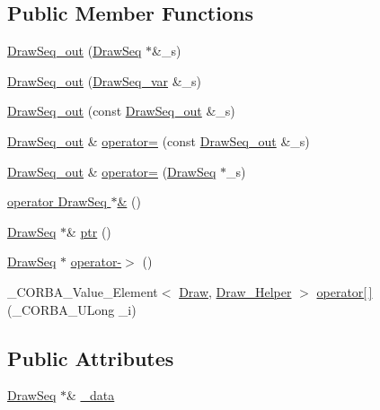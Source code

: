 \subsection*{Public Member Functions}
\begin{DoxyCompactItemize}
\item 
\hyperlink{class_draw_seq__out_a3bcf2290b7ec119dd19ccf5b377c1aa1}{Draw\+Seq\+\_\+out} (\hyperlink{class_draw_seq}{Draw\+Seq} $\ast$\&\+\_\+s)
\item 
\hyperlink{class_draw_seq__out_a9aa391f0c2e359b622ca004de2febf74}{Draw\+Seq\+\_\+out} (\hyperlink{class_draw_seq__var}{Draw\+Seq\+\_\+var} \&\+\_\+s)
\item 
\hyperlink{class_draw_seq__out_ad924617c29ae2842379aa377c5ff797f}{Draw\+Seq\+\_\+out} (const \hyperlink{class_draw_seq__out}{Draw\+Seq\+\_\+out} \&\+\_\+s)
\item 
\hyperlink{class_draw_seq__out}{Draw\+Seq\+\_\+out} \& \hyperlink{class_draw_seq__out_a94b4fa040ba74b352f90918383cb7ff8}{operator=} (const \hyperlink{class_draw_seq__out}{Draw\+Seq\+\_\+out} \&\+\_\+s)
\item 
\hyperlink{class_draw_seq__out}{Draw\+Seq\+\_\+out} \& \hyperlink{class_draw_seq__out_ac27b922495c2dacebe0a4f92dc66c937}{operator=} (\hyperlink{class_draw_seq}{Draw\+Seq} $\ast$\+\_\+s)
\item 
\hyperlink{class_draw_seq__out_afe73ef013d4a5d6c843e6c3ff2dbfe98}{operator Draw\+Seq $\ast$\&} ()
\item 
\hyperlink{class_draw_seq}{Draw\+Seq} $\ast$\& \hyperlink{class_draw_seq__out_aa2723e52af6f4aecd33f619ffb3f9205}{ptr} ()
\item 
\hyperlink{class_draw_seq}{Draw\+Seq} $\ast$ \hyperlink{class_draw_seq__out_ac5275d7c723608533feb25d9def2b9cd}{operator-\/$>$} ()
\item 
\+\_\+\+C\+O\+R\+B\+A\+\_\+\+Value\+\_\+\+Element$<$ \hyperlink{class_draw}{Draw}, \hyperlink{class_draw___helper}{Draw\+\_\+\+Helper} $>$ \hyperlink{class_draw_seq__out_ade588ecd45acfb9aacbf9cdc58464c42}{operator\mbox{[}$\,$\mbox{]}} (\+\_\+\+C\+O\+R\+B\+A\+\_\+\+U\+Long \+\_\+i)
\end{DoxyCompactItemize}
\subsection*{Public Attributes}
\begin{DoxyCompactItemize}
\item 
\hyperlink{class_draw_seq}{Draw\+Seq} $\ast$\& \hyperlink{class_draw_seq__out_a84073e66bec09b833c5c11ff7cac2d18}{\+\_\+data}
\end{DoxyCompactItemize}


